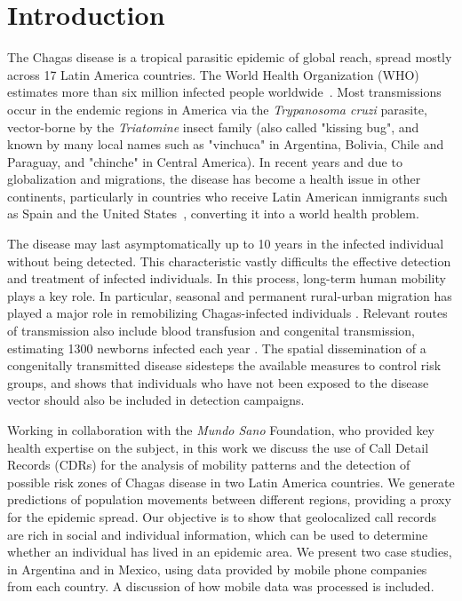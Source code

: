 \section{Introduction}

The Chagas disease is a tropical parasitic epidemic of global reach, spread mostly across 17 Latin America countries. The World Health Organization (WHO) estimates more than six million infected people worldwide~\cite{who2016}. Most transmissions occur in the endemic regions in America via the \textit{Trypanosoma cruzi} parasite, vector-borne by the \textit{Triatomine} insect family (also called "kissing bug", and known by many local names such as "vinchuca" in Argentina, Bolivia, Chile and Paraguay, and "chinche" in Central America). In recent years and due to globalization and migrations, the disease has become a health issue in other continents, particularly in countries who receive Latin American inmigrants such as Spain and the United States~\cite{schmunis2010chagas}, converting it into a world health problem.

The disease may last asymptomatically up to 10 years in the infected individual without being detected. This characteristic vastly difficults the effective detection and treatment of infected individuals. In this process, long-term human mobility plays a key role. In particular, seasonal and permanent rural-urban migration has played a major role in remobilizing Chagas-infected individuals \cite{briceno2009chagas}. 
Relevant routes of transmission also include blood transfusion and congenital transmission, estimating 1300 newborns infected each year \cite{OPS2006chagas}.
The spatial dissemination of a congenitally transmitted disease sidesteps the available measures to control risk groups, and shows that individuals who have not been exposed to the disease vector should also be included in detection campaigns.

Working in collaboration with the \textit{Mundo Sano} Foundation, who provided key health expertise on the subject, in this work we discuss the use of Call Detail Records (CDRs) for the analysis of mobility patterns and the detection of possible risk zones of Chagas disease in two Latin America countries. We generate predictions of population movements between different regions, providing a proxy for the epidemic spread. Our objective is to show that geolocalized call records are rich in social and individual information, which can be used to determine whether an individual has lived in an epidemic area. We present two case studies, in Argentina and in Mexico, using data provided by mobile phone companies from each country. A discussion of how mobile data was processed is included. 

